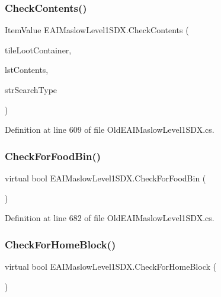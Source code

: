 \subsubsection{\texorpdfstring{CheckContents()}{CheckContents()}}
{\footnotesize\ttfamily Item\+Value E\+A\+I\+Maslow\+Level1\+S\+D\+X.\+Check\+Contents (\begin{DoxyParamCaption}\item[{Tile\+Entity\+Loot\+Container}]{tile\+Loot\+Container,  }\item[{List$<$ String $>$}]{lst\+Contents,  }\item[{String}]{str\+Search\+Type }\end{DoxyParamCaption})}



Definition at line 609 of file Old\+E\+A\+I\+Maslow\+Level1\+S\+D\+X.\+cs.

\mbox{\label{class_e_a_i_maslow_level1_s_d_x_a03cc8884c63526dee61a79ca087ef8ff}} 
\subsubsection{\texorpdfstring{CheckForFoodBin()}{CheckForFoodBin()}}
{\footnotesize\ttfamily virtual bool E\+A\+I\+Maslow\+Level1\+S\+D\+X.\+Check\+For\+Food\+Bin (\begin{DoxyParamCaption}{ }\end{DoxyParamCaption})\hspace{0.3cm}{\ttfamily [virtual]}}



Definition at line 682 of file Old\+E\+A\+I\+Maslow\+Level1\+S\+D\+X.\+cs.

\mbox{\label{class_e_a_i_maslow_level1_s_d_x_ae71e14b4437a087ed4401c4d6a996997}} 
\subsubsection{\texorpdfstring{CheckForHomeBlock()}{CheckForHomeBlock()}}
{\footnotesize\ttfamily virtual bool E\+A\+I\+Maslow\+Level1\+S\+D\+X.\+Check\+For\+Home\+Block (\begin{DoxyParamCaption}{ }\end{DoxyParamCaption})\hspace{0.3cm}{\ttfamily [virtual]}}



